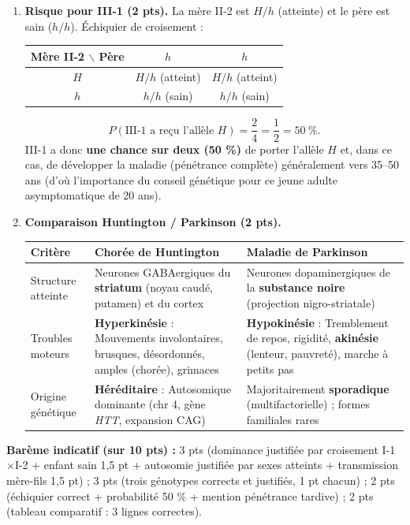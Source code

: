 \documentclass[11pt]{article}
\begin{document}
\begin{corrige}
\begin{enumerate}
\begin{itemize}
\item \textbf{II-2} est atteinte : elle possède au moins un $H$. Son père I-2 ($h/h$) ne peut lui transmettre qu'un $h$ ; elle a donc obligatoirement reçu $H$ de sa mère I-1 : elle est \textbf{hétérozygote $H/h$}.
\end{itemize}
\[ \text{I-1 : } H/h \qquad \text{I-2 : } h/h \qquad \text{II-2 : } H/h \]
\item \textbf{Risque pour III-1 (2 pts).} La mère II-2 est $H/h$ (atteinte) et le père est sain ($h/h$). Échiquier de croisement :
\begin{center}
\begin{tabular}{|c|c|c|}
\hline
\rowcolor{popblueL} Mère II-2 $\backslash$ Père & $h$ & $h$ \\
\hline
$H$ & $H/h$ (atteint) & $H/h$ (atteint) \\
\hline
$h$ & $h/h$ (sain) & $h/h$ (sain) \\
\hline
\end{tabular}
\end{center}
\[ P(\text{III-1 a reçu l'allèle } H) = \dfrac{2}{4} = \dfrac{1}{2} = 50\ \%. \]
III-1 a donc \textbf{une chance sur deux (50 \%)} de porter l'allèle $H$ et, dans ce cas, de développer la maladie (pénétrance complète) généralement vers 35--50 ans (d'où l'importance du conseil génétique pour ce jeune adulte asymptomatique de 20 ans).
\item \textbf{Comparaison Huntington / Parkinson (2 pts).}
\begin{center}
\begin{tabularx}{\linewidth}{|l|X|X|}
\hline
\rowcolor{popblueL} Critère & \textbf{Chorée de Huntington} & \textbf{Maladie de Parkinson} \\
\hline
Structure atteinte & Neurones GABAergiques du \textbf{striatum} (noyau caudé, putamen) et du cortex & Neurones dopaminergiques de la \textbf{substance noire} (projection nigro-striatale) \\
\hline
Troubles moteurs & \textbf{Hyperkinésie} : Mouvements involontaires, brusques, désordonnés, amples (chorée), grimaces & \textbf{Hypokinésie} : Tremblement de repos, rigidité, \textbf{akinésie} (lenteur, pauvreté), marche à petits pas \\
\hline
Origine génétique & \textbf{Héréditaire} : Autosomique dominante (chr 4, gène \emph{HTT}, expansion CAG) & Majoritairement \textbf{sporadique} (multifactorielle) ; formes familiales rares \\
\hline
\end{tabularx}
\end{center}
\end{enumerate}
\textbf{Barème indicatif (sur 10 pts) :} 3 pts (dominance justifiée par croisement I-1$\times$I-2 + enfant sain 1,5 pt + autosomie justifiée par sexes atteints + transmission mère-fils 1,5 pt) ; 3 pts (trois génotypes corrects et justifiés, 1 pt chacun) ; 2 pts (échiquier correct + probabilité 50 \% + mention pénétrance tardive) ; 2 pts (tableau comparatif : 3 lignes correctes).


\end{corrige}
\end{document}
